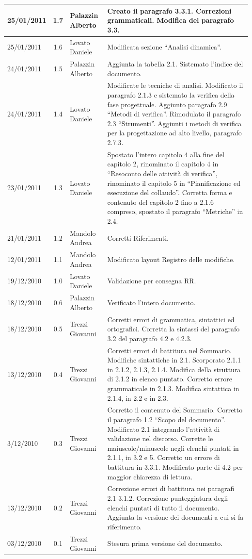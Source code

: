 \begin{longtable}{|p{}|c|p{}|p{}|}
\hline
25/01/2011 & 1.7 & Palazzin Alberto & Creato il paragrafo 3.3.1. Correzioni
grammaticali. Modifica del paragrafo 3.3.\\
\hline
25/01/2011 & 1.6 & Lovato Daniele & Modificata sezione ``Analisi dinamica''.\\
\hline
24/01/2011 & 1.5 & Palazzin Alberto & Aggiunta la tabella 2.1. Sistemato
l'indice del documento.\\
\hline
24/01/2011 & 1.4 & Lovato Daniele & Modificate le tecniche di analisi.
Modificato il paragrafo 2.1.3 e sistemato la verifica della fase progettuale.
Aggiunto paragrafo 2.9 ``Metodi di verifica''. Rimodulato il paragrafo 2.3
``Strumenti''. Aggiunti i metodi di verifica per la progettazione ad alto
livello, paragrafo 2.7.3.\\
\hline
23/01/2011 & 1.3 & Lovato Daniele & Spostato l'intero capitolo 4 alla fine
del capitolo 2, rinominato il capitolo 4 in ``Resoconto delle attivit\`a di
verifica'', rinominato il capitolo 5 in ``Pianificazione ed esecuzione del
collaudo''. Corretta forma e contenuto del capitolo 2 fino a 2.1.6 compreso,
spostato il paragrafo ``Metriche'' in 2.4.  
\\
\hline
21/01/2011 & 1.2 & Mandolo Andrea & Corretti Riferimenti.\\
\hline
12/01/2011 & 1.1 & Mandolo Andrea & Modificato layout Registro delle
modifiche.\\
\hline
19/12/2010 & 1.0 & Lovato Daniele & Validazione per consegna RR.\\
\hline
18/12/2010 & 0.6 & Palazzin Alberto & Verificato l'intero documento.\\
\hline
18/12/2010 & 0.5 & Trezzi Giovanni & Corretti errori di grammatica, sintattici
ed ortografici. Corretta la sintassi del paragrafo 3.2 del paragrafo 4.2 e
4.2.3.\\
\hline
13/12/2010 & 0.4 & Trezzi Giovanni & Corretti errori di battitura nel Sommario.
Modifiche sintattiche in 2.1. Scorporato 2.1.1 in 2.1.2, 2.1.3, 2.1.4. Modifica della
struttura di 2.1.2 in elenco puntato. Corretto errore grammaticale in 2.1.3.
Modifica sintattica in 2.1.4, in 2.2 e in 2.3.\\
\hline
3/12/2010 & 0.3 & Trezzi Giovanni & Corretto il contenuto del Sommario. Corretto
il paragrafo 1.2 ``Scopo del documento''. Modificato 2.1 integrando l'attivit\`a
di validazione nel discorso. Corrette le maiuscole/minuscole negli elenchi
puntati in 2.1.1, in 3.2 e 5. Corretto un errore di battitura in 3.3.1.
Modificato parte di 4.2 per maggior chiarezza di lettura.\\
\hline
13/12/2010 & 0.2 & Trezzi Giovanni & Correzione errori di battitura nei
paragrafi 2.1 3.1.2. Correzione punteggiatura degli elenchi puntati di tutto il documento.
Aggiunta la versione dei documenti a cui si fa riferimento.\\
\hline
03/12/2010 & 0.1 & Trezzi Giovanni & Stesura prima versione del documento.\\
\end{longtable}

